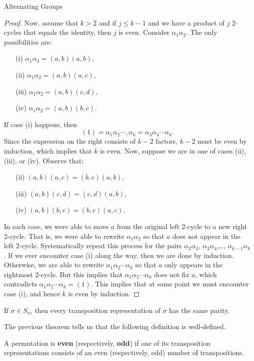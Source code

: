 \begin{section}{Alternating Groups}
\begin{proof}
Now, assume that $k>2$ and if $j\leq k-1$ and we have a product of $j$ 2-cycles that equals the identity, then $j$ is even. Consider $\alpha_1\alpha_2$. The only possibilities are:
\begin{enumerate}
\item[(i)] $\alpha_1\alpha_2=(a,b)(a,b)$,
\item[(ii)] $\alpha_1\alpha_2=(a,b)(a,c)$,
\item[(iii)] $\alpha_1\alpha_2=(a,b)(c,d)$,
\item[(iv)] $\alpha_1\alpha_2=(a,b)(b,c)$.
\end{enumerate}
If case (i) happens, then
\[
(1)=\alpha_1\alpha_2\cdots,\alpha_k=\alpha_3\alpha_4\cdots\alpha_k.
\]
Since the expression on the right consists of $k-2$ factors, $k-2$ must be even by induction, which implies that $k$ is even. Now, suppose we are in one of cases (ii), (iii), or (iv). Observe that:
\begin{enumerate}
\item[(ii)] $(a,b)(a,c)=(b,c)(a,b)$,
\item[(iii)] $(a,b)(c,d)=(c,d)(a,b)$,
\item[(iv)] $(a,b)(b,c)=(b,c)(a,c)$.
\end{enumerate}
In each case, we were able to move $a$ from the original left 2-cycle to a new right 2-cycle. That is, we were able to rewrite $\alpha_1\alpha_2$ so that $a$ does not appear in the left 2-cycle. Systematically repeat this process for the pairs $\alpha_2\alpha_3$, $\alpha_3\alpha_4$,\ldots, $\alpha_{k-1}\alpha_k$. If we ever encounter case (i) along the way, then we are done by induction. Otherwise, we are able to rewrite $\alpha_1\alpha_2\cdots\alpha_k$ so that $a$ only appears in the rightmost 2-cycle. But this implies that $\alpha_1\alpha_2\cdots\alpha_k$ does not fix $a$, which contradicts $\alpha_1\alpha_2\cdots\alpha_k =(1)$. This implies that at some point we must encounter case (i), and hence $k$ is even by induction.
\end{proof}

\begin{theorem}
If $\sigma\in S_n$, then every transposition representation of $\sigma$ has the same parity.
\end{theorem}

The previous theorem tells us that the following definition is well-defined.

\begin{definition}
A permutation is \textbf{even} (respectively, \textbf{odd}) if one of its transposition representations consists of an even (respectively, odd) number of transpositions.
\end{definition}


\end{section}

